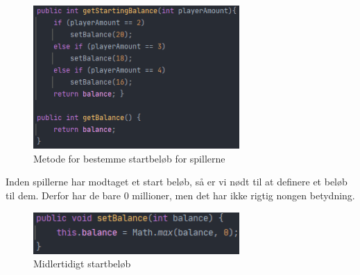 \begin{figure}[H]
    \centering
    \includegraphics[width=0.7\textwidth]{sources/7_implementering/startBal.PNG}
    \caption{Metode for bestemme startbeløb for spillerne}
    \label{fig:chance}
\end{figure}
Inden spillerne har modtaget et start beløb, så er vi nødt til at definere et beløb til dem. Derfor har de bare 0 millioner, men det har ikke rigtig nongen betydning.
\begin{figure}[H]
    \centering
    \includegraphics[width=0.7\textwidth]{sources/7_implementering/getBal.png}
    \caption{Midlertidigt startbeløb}
    \label{fig:chance}
\end{figure}
